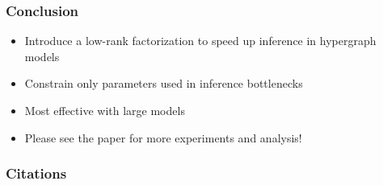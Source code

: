 \documentclass{beamer}
\begin{document}
\begin{frame}
\frametitle{Conclusion}
\begin{itemize}
\item Introduce a low-rank factorization to speed up inference in hypergraph models
\vspace{2em}
\item Constrain only parameters used in inference bottlenecks
\vspace{2em}
\item Most effective with large models
\vspace{2em}
\item Please see the paper for more experiments and analysis!
\end{itemize}
\end{frame}


\begin{frame}[allowframebreaks]
\frametitle{Citations}
\printbibliography
\end{frame}
\end{document}

